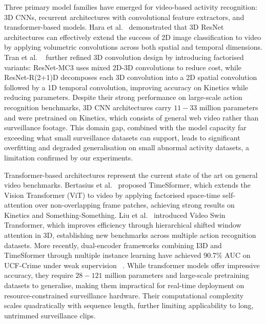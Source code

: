 \documentclass[11pt,a4paper]{article}
\begin{document}
	Three primary model families have emerged for video-based activity recognition: 3D CNNs, 
	recurrent architectures with convolutional feature extractors, and transformer-based
	models. Hara et al.~\cite{hara2018resnet3d} demonstrated that 3D ResNet architectures can
	effectively extend the success of 2D image classification to video by applying volumetric
	convolutions across both spatial and temporal dimensions. Tran et al.
	~\cite{tran2018closer} further refined 3D convolution design by introducing factorised 
	variants: ResNet-MC3 uses mixed 2D-3D convolutions to reduce cost, while ResNet-R(2+1)D
	decomposes each 3D convolution into a 2D spatial convolution followed by a 1D temporal
	convolution, improving accuracy on Kinetics while reducing parameters. Despite their
	strong performance on large-scale action recognition benchmarks, 3D CNN architectures
	carry $11-33$ million parameters and were pretrained on Kinetics, which consists of
	general web video rather than surveillance footage. This domain gap, combined with the 
	model capacity far exceeding what small surveillance datasets can support, leads to
	significant overfitting and degraded generalisation on small abnormal activity datasets,
	a limitation confirmed by our experiments.

	Transformer-based architectures represent the current state of the art on general video
	benchmarks. Bertasius et al.~\cite{bertasius2021timesformer} proposed TimeSformer, which 
	extends the Vision Transformer (ViT) to video by applying factorised space-time
	self-attention over non-overlapping frame patches, achieving strong results on Kinetics
	and Something-Something. Liu et al.~\cite{liu2022videoswin} introduced Video Swin
	Transformer, which improves efficiency through hierarchical shifted window attention in 
	3D, establishing new benchmarks across multiple action recognition datasets. More 
	recently, dual-encoder frameworks combining I3D and TimeSformer through multiple instance
	learning have achieved 90.7\% AUC on UCF-Crime under weak supervision
	~\cite{dual_backbone_2025}. While transformer models offer impressive accuracy, they
	require $28-121$ million parameters and large-scale pretraining datasets to generalise, 
	making them impractical for real-time deployment on resource-constrained surveillance 
	hardware. Their computational complexity scales quadratically with sequence length, 
	further limiting applicability to long, untrimmed surveillance clips.
\end{document}

